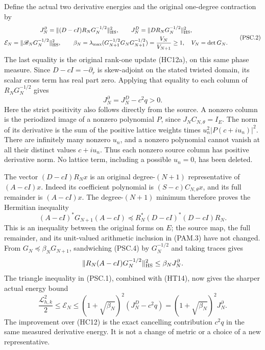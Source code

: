 Define the actual two derivative energies and the original
one-degree contraction by
\[
 \begin{gathered}
 J_N^\partial=\|(D-cI)R_NG_N^{-1/2}\|_{\rm HS}^2,\qquad
 J_N^D=\|DR_NG_N^{-1/2}\|_{\rm HS}^2,\\
 \mathcal E_N=\|\mathscr B_NG_N^{-1/2}\|_{\rm HS}^2,\qquad
 \beta_N=\lambda_{\max}
       (G_{N+1}^{-1/2}G_NG_{N+1}^{-1/2})
       =\frac{V_N}{V_{N+1}}\ge1,\quad V_N=\det G_N .
 \end{gathered}
 \tag{PSC.2}\label{CFStage:eq:psc-energies}
\]
The last equality is the original rank-one update (HC12a), on this
same phase measure. Since \(D-cI=-\partial_r\) is skew-adjoint
on the stated twisted domain, its scalar cross term has real part
zero. Applying that equality to each column of \(R_NG_N^{-1/2}\)
gives
\[
 J_N^\partial=J_N^D-c^2q>0 .
 \tag{PSC.3}\label{CFStage:eq:psc-cancellation}
\]
Here the strict positivity also follows directly from the source.
A nonzero column is the periodized image of a nonzero polynomial
\(P\), since \(J_NC_{N,\theta}=I_E\).
The norm of its derivative is the sum of the positive lattice
weights times \(u_n^2|P(c+iu_n)|^2\).
There are infinitely many nonzero \(u_n\), and a nonzero polynomial
cannot vanish at all their distinct values \(c+iu_n\).
Thus each nonzero source column has positive derivative norm.
No lattice term, including a possible \(u_n=0\), has been deleted.

The vector \((D-cI)R_Nx\) is an original degree-\((N+1)\)
representative of \((A-cI)x\). Indeed its coefficient polynomial
is \((S-c)C_{N,\theta}x\), and its full remainder is
\((A-cI)x\). The degree-\((N+1)\) minimum therefore proves the
Hermitian inequality
\[
 (A-cI)^*G_{N+1}(A-cI)
 \preceq R_N^*(D-cI)^*(D-cI)R_N .
 \tag{PSC.4}\label{CFStage:eq:psc-minimum}
\]
This is an inequality between the original forms on \(E\);
the source map, the full remainder, and its unit-valued arithmetic
inclusion in (PAM.3) have not changed.
From \(G_N\preceq\beta_NG_{N+1}\), sandwiching (PSC.4) by
\(G_N^{-1/2}\) and taking traces gives
\[
 \|R_N(A-cI)G_N^{-1/2}\|_{\rm HS}^2
 \le\beta_NJ_N^\partial.
\]
The triangle inequality in (PSC.1), combined with (HT14), now gives
the sharper actual energy bound
\[
 \boxed{\quad
 \frac{\mathcal L_{h,k}^2}{2}
 \le\mathcal E_N
 \le(1+\sqrt{\beta_N})^2
           (J_N^D-c^2q)
 =(1+\sqrt{\beta_N})^2J_N^\partial .
 \quad}
 \tag{PSC.5}\label{CFStage:eq:psc-sharperenergy}
\]
The improvement over (HC12) is the exact cancelling contribution
\(c^2q\) in the same measured derivative energy. It is not a
change of metric or a choice of a new representative.

